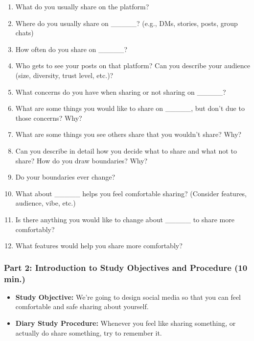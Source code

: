 \begin{enumerate}
    \item What do you usually share on the platform?
    \item Where do you usually share on \_\_\_\_\_? (e.g., DMs, stories, posts, group chats)
    \item How often do you share on \_\_\_\_\_?
    \item Who gets to see your posts on that platform? Can you describe your audience (size, diversity, trust level, etc.)?
    \item What concerns do you have when sharing or not sharing on \_\_\_\_\_?
    \item What are some things you would like to share on \_\_\_\_\_, but don’t due to those concerns? Why?
    \item What are some things you see others share that you wouldn’t share? Why?
    \item Can you describe in detail how you decide what to share and what not to share? How do you draw boundaries? Why?
    \item Do your boundaries ever change?
    \item What about \_\_\_\_\_ helps you feel comfortable sharing? (Consider features, audience, vibe, etc.)
    \item Is there anything you would like to change about \_\_\_\_\_ to share more comfortably?
    \item What features would help you share more comfortably?
\end{enumerate}

\subsubsection*{Part 2: Introduction to Study Objectives and Procedure (10 min.)} 

\begin{itemize}
    \item \textbf{Study Objective:}  
    We’re going to design social media so that you can feel comfortable and safe sharing about yourself.

    \item \textbf{Diary Study Procedure:}  
    Whenever you feel like sharing something, or actually do share something, try to remember it.
\end{itemize}